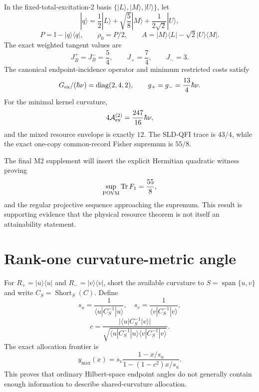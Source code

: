 \documentclass[aps,pra,preprint,nofootinbib]{revtex4-2}
\newcommand{\Tr}{\operatorname{Tr}}
\newcommand{\id}{\mathbb I}
\newcommand{\rhozero}{\rho_0}
\newcommand{\Aact}{\mathcal A}
\begin{document}
In the fixed-total-excitation-2 basis $\{|L\rangle,|M\rangle,|U\rangle\}$, let
\begin{equation}
|q\rangle=\frac12|L\rangle+\sqrt{\frac58}|M\rangle+\frac1{2\sqrt2}|U\rangle,
\end{equation}
\begin{equation}
P=\id-|q\rangle\!\langle q|,
\qquad
\rhozero=P/2,
\qquad
A=|M\rangle\!\langle L|-\sqrt2|U\rangle\!\langle M|.
\end{equation}
The exact weighted tangent values are
\begin{equation}
J_B^+=J_B^-=\frac54,
\qquad
J_+=\frac74,
\qquad
J_-=3.
\end{equation}
The canonical endpoint-incidence operator and minimum restricted costs satisfy
\begin{equation}
G_{\rm ex}/(\hbar\nu)=\operatorname{diag}(2,4,2),
\qquad
g_+=g_-=\frac{13}{4}\hbar\nu.
\end{equation}
For the minimal kernel curvature,
\begin{equation}
4\Aact_{\rm ex}^{(2)}=\frac{247}{16}\hbar\nu,
\end{equation}
and the mixed resource envelope is exactly $12$. The SLD-QFI trace is $43/4$, while the exact one-copy common-record Fisher supremum is $55/8$.

The final M2 supplement will insert the explicit Hermitian quadratic witness proving
\begin{equation}
\sup_{\rm POVM}\Tr F_1=\frac{55}{8},
\end{equation}
and the regular projective sequence approaching the supremum. This result is supporting evidence that the physical resource theorem is not itself an attainability statement.

\section{Rank-one curvature-metric angle}
\label{supp:rankone-angle}

For $R_+=|u\rangle\langle u|$ and $R_-=|v\rangle\langle v|$, short the available curvature to $S=\operatorname{span}\{u,v\}$ and write $C_S=\operatorname{Short}_S(C)$. Define
\begin{equation}
s_u=\frac1{\langle u|C_S^{-1}|u\rangle},
\quad
s_v=\frac1{\langle v|C_S^{-1}|v\rangle},
\end{equation}
\begin{equation}
c=\frac{|\langle u|C_S^{-1}|v\rangle|}
{\sqrt{\langle u|C_S^{-1}|u\rangle\langle v|C_S^{-1}|v\rangle}}.
\end{equation}
The exact allocation frontier is
\begin{equation}
y_{\max}(x)=s_v\frac{1-x/s_u}{1-(1-c^2)x/s_u}.
\end{equation}
This proves that ordinary Hilbert-space endpoint angles do not generally contain enough information to describe shared-curvature allocation.
\end{document}
